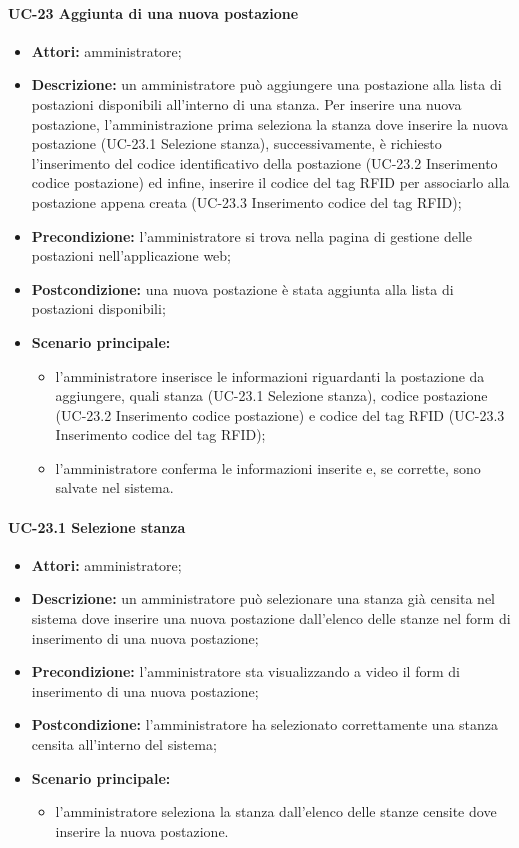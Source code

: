 \paragraph{UC-23 Aggiunta di una nuova postazione}
\begin{itemize}
    \item \textbf{Attori:} amministratore;
    \item \textbf{Descrizione:} un amministratore pu\`{o} aggiungere una postazione alla lista di postazioni disponibili all'interno di una stanza. Per inserire una nuova postazione, l'amministrazione prima seleziona la stanza dove inserire la nuova postazione (UC-23.1 Selezione stanza), successivamente, è richiesto l'inserimento del codice identificativo della postazione (UC-23.2 Inserimento codice postazione) ed infine, inserire il codice del tag RFID per associarlo alla postazione appena creata (UC-23.3 Inserimento codice del tag RFID);
    \item \textbf{Precondizione:} l'amministratore si trova nella pagina di gestione delle postazioni nell'applicazione web;
    \item \textbf{Postcondizione:} una nuova postazione \`{e} stata aggiunta alla lista di postazioni disponibili;
    \item \textbf{Scenario principale:}
    \begin{itemize}
        \item l'amministratore inserisce le informazioni riguardanti la postazione da aggiungere, quali stanza (UC-23.1 Selezione stanza), codice postazione (UC-23.2 Inserimento codice postazione) e codice del tag RFID (UC-23.3 Inserimento codice del tag RFID);
        \item l'amministratore conferma le informazioni inserite e, se corrette, sono salvate nel sistema.
    \end{itemize}
\end{itemize}


\paragraph{UC-23.1 Selezione stanza}
\begin{itemize}
    \item \textbf{Attori:} amministratore;
    \item \textbf{Descrizione:} un amministratore pu\`{o} selezionare una stanza già censita nel sistema dove inserire una nuova postazione dall'elenco delle stanze nel form di inserimento di una nuova postazione;
    \item \textbf{Precondizione:} l'amministratore sta visualizzando a video il form di inserimento di una nuova postazione;
    \item \textbf{Postcondizione:} l'amministratore ha selezionato correttamente una stanza censita all'interno del sistema;
    \item \textbf{Scenario principale:}
    \begin{itemize}
        \item l'amministratore seleziona la stanza dall'elenco delle stanze censite dove inserire la nuova postazione.
    \end{itemize}
\end{itemize}


